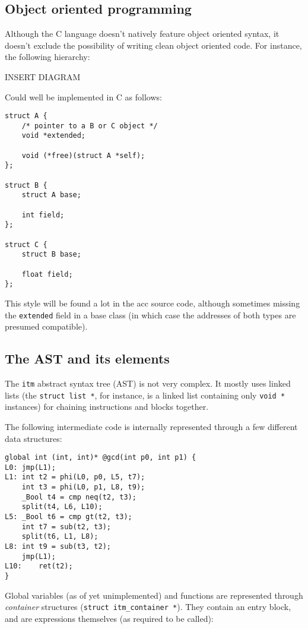 \documentclass[12pt, a4paper]{article}
\begin{document}
  \subsection{Object oriented programming}
Although the C language doesn't natively feature object oriented syntax, it doesn't
exclude the possibility of writing clean object oriented code. For instance, the
following hierarchy:

INSERT DIAGRAM

Could well be implemented in C as follows:

\begin{lstlisting}
struct A {
	/* pointer to a B or C object */
	void *extended;

	void (*free)(struct A *self);
};

struct B {
	struct A base;

	int field;
};

struct C {
	struct B base;

	float field;
};
\end{lstlisting}

This style will be found a lot in the acc source code, although sometimes
missing the \verb+extended+ field in a base class (in which case the addresses
of both types are presumed compatible).

  \subsection{The AST and its elements}
The \verb+itm+ abstract syntax tree (AST) is not very complex. It mostly uses
linked lists (the \verb+struct list *+, for instance, is a linked list containing
only \verb+void *+ instances) for chaining instructions and blocks together.

The following intermediate code is internally represented through a few different
data structures:

\begin{lstlisting}
global int (int, int)* @gcd(int p0, int p1) {
L0:	jmp(L1);
L1:	int t2 = phi(L0, p0, L5, t7);
	int t3 = phi(L0, p1, L8, t9);
	_Bool t4 = cmp neq(t2, t3);
	split(t4, L6, L10);
L5:	_Bool t6 = cmp gt(t2, t3);
	int t7 = sub(t2, t3);
	split(t6, L1, L8);
L8:	int t9 = sub(t3, t2);
	jmp(L1);
L10:	ret(t2);
}
\end{lstlisting}

Global variables (as of yet unimplemented) and functions are represented through
\textit{container} structures (\verb+struct itm_container *+). They contain an
entry block, and are expressions themselves (as required to be called):
\end{document}
